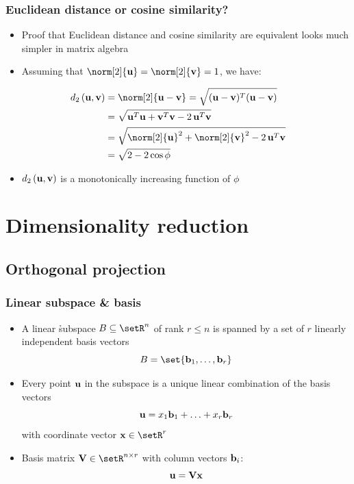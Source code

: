 \documentclass[t]{beamer} %
\begin{document}
\begin{frame}[fragile]
  \frametitle{Euclidean distance or cosine similarity?}

  \begin{itemize}
  \item Proof that Euclidean distance and cosine similarity are equivalent looks much simpler in matrix algebra
  \item Assuming that $\norm[2]{\vu} = \norm[2]{\vv} = 1$, we have:
  \end{itemize}

  \ungap[1]
  \begin{align*}
    \dist[2]{\vu}{\vv} 
    &= \norm[2]{\vu - \vv}
    = \sqrt{(\vu - \vv)^T (\vu - \vv)}
    \\
    &= \sqrt{\vu^T \vu + \vv^T \vv - 2\, \vu^T \vv}
    \\
    &= \sqrt{\norm[2]{\vu}^2 + \norm[2]{\vv}^2 - 2\, \vu^T \vv}
    \\
    &= \sqrt{2 - 2 \cos \phi}
  \end{align*}
  \ungap
  \begin{itemize}
  \item[\hand] $\dist[2]{\vu}{\vv}$ is a monotonically increasing function of $\phi$
  \end{itemize}
\end{frame}


\section{Dimensionality reduction}

\subsection{Orthogonal projection}

\begin{frame}
  \frametitle{Linear subspace \& basis}
  
  \begin{itemize}
  \item A linear \h{subspace} $B\subseteq \setR^n$ of rank $r\leq n$ is spanned by a set of $r$ linearly independent basis vectors
    \[
    B = \set{\vb_1, \ldots, \vb_r}
    \]
  \item<2-> Every point $\vu$ in the subspace is a unique linear combination of the basis vectors
    \[
    \vu = x_1 \vb_1 + \ldots + x_r \vb_r
    \]
    with coordinate vector $\vx\in \setR^r$
  \item<3-> Basis matrix $\mathbf{V} \in \setR^{n\times r}$ with column vectors $\vb_i$:
    \[
    \vu = \mathbf{V} \vx 
    \]
  \end{itemize}
\end{frame}
\end{document}
